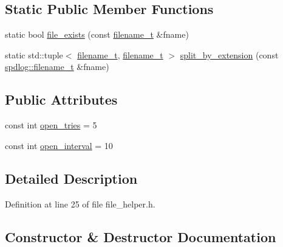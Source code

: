 \subsection*{Static Public Member Functions}
\begin{DoxyCompactItemize}
\item 
static bool \hyperlink{classspdlog_1_1details_1_1file__helper_a8c5f69588e8a54f436c3565317c233bd}{file\+\_\+exists} (const \hyperlink{namespacespdlog_acf7ce125b3622e44f8f1702d699e0b06}{filename\+\_\+t} \&fname)
\item 
static std\+::tuple$<$ \hyperlink{namespacespdlog_acf7ce125b3622e44f8f1702d699e0b06}{filename\+\_\+t}, \hyperlink{namespacespdlog_acf7ce125b3622e44f8f1702d699e0b06}{filename\+\_\+t} $>$ \hyperlink{classspdlog_1_1details_1_1file__helper_a28d87e3f42c52a12c95af0558aca66f2}{split\+\_\+by\+\_\+extension} (const \hyperlink{namespacespdlog_acf7ce125b3622e44f8f1702d699e0b06}{spdlog\+::filename\+\_\+t} \&fname)
\end{DoxyCompactItemize}
\subsection*{Public Attributes}
\begin{DoxyCompactItemize}
\item 
const int \hyperlink{classspdlog_1_1details_1_1file__helper_a22be952a421d866566eed3a5ce201144}{open\+\_\+tries} = 5
\item 
const int \hyperlink{classspdlog_1_1details_1_1file__helper_aea72ea8d655bb11f19dbe48477e6c8b3}{open\+\_\+interval} = 10
\end{DoxyCompactItemize}


\subsection{Detailed Description}


Definition at line 25 of file file\+\_\+helper.\+h.



\subsection{Constructor \& Destructor Documentation}
\mbox{\label{classspdlog_1_1details_1_1file__helper_aa11a5129c9d7492638a68d849d66d47d}} 
